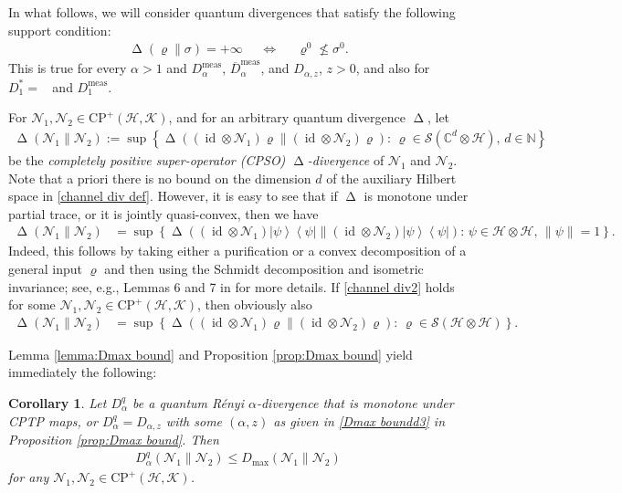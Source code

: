 \documentclass[unsortedaddress,superscriptaddress,pra,notitlepage]{revtex4}
\newtheorem{cor}[definition]{Corollary}
\def\N{\mathcal{N}}
\def\S{{\mathcal S}}
\def\bN{\mathbb{N}}
\def\bC{\mathbb{C}}
\def\rho{\varrho}
\def\hil{{\mathcal H}}
\def\kil{{\mathcal K}}
\def\iff{\Longleftrightarrow}
\def\bz{\left(}
\def\jz{\right)}
\def\oll{\overline}
\def\CP{\mathrm{CP}}
\def\nw{^{*}}
\def\meas{\mathrm{meas}}
\newcommand{\ki}[1]{\textit{\textit{#1}}}
\newcommand{\ds}{\mbox{ }\mbox{ }}
\newcommand{\norm}[1]{\left\| #1\right\|}
\newcommand{\diad}[2]{\left|#1\right\rangle\!\left\langle #2\right|}
\newcommand{\pr}[1]{\diad{#1}{#1}}
\DeclareMathOperator{\id}{id}
\DeclareMathOperator{\divv}{\Delta}
\DeclareMathOperator{\DU}{\mathit{D}^{Um}}
\begin{document}
In what follows, we will consider quantum divergences that satisfy the following support condition:
\begin{align}\label{support condition}
\divv(\rho\|\sigma)=+\infty\ds\iff\ds\rho^0\nleq\sigma^0.
\end{align}
This is true for every $\alpha>1$ and $D_{\alpha}^{\meas}$, $\oll{D}_{\alpha}^{\meas}$, and $D_{\alpha,z}$, $z>0$, and also for $D_1\nw=\DU$ and $D_1^{\meas}$.

For $\N_1,\N_2\in \CP^+(\hil,\kil)$, and for an arbitrary 
quantum divergence $\divv$, let 
\begin{align}\label{channel div def}
\divv(\N_1\|\N_2):=\sup\left\{\divv\bz(\id\otimes\N_1)\rho\|(\id\otimes\N_2)\rho\jz:\,
\rho\in\S(\bC^d\otimes\hil),\,d\in\bN\right\}
\end{align}
be the \ki{completely positive super-operator (CPSO) $\divv$-divergence} of $\N_1$ and $\N_2$.
Note that a priori there is no bound on the dimension $d$ of the auxiliary Hilbert space 
in \eqref{channel div def}. However, 
it is easy to see that if $\divv$ is monotone under partial trace, or it is jointly quasi-convex, then we have 
\begin{align}\label{channel div2}
\divv(\N_1\|\N_2)
&=
\sup\left\{\divv\bz(\id\otimes\N_1)\pr{\psi}\|(\id\otimes\N_2)\pr{\psi}\jz:\,
\psi\in\hil\otimes\hil,\,\norm{\psi}=1\right\}.
\end{align}
Indeed, this follows by taking either a purification or a convex decomposition of a general input $\rho$ and then using the Schmidt decomposition and isometric invariance;
see, e.g., Lemmas 6 and 7 in \cite{CMW} for more details.
If \eqref{channel div2} holds for some 
$\N_1,\N_2\in\CP^+(\hil,\kil)$, then obviously also
\begin{align}\label{channel div3}
\divv(\N_1\|\N_2)
&=
\sup\left\{\divv\bz(\id\otimes\N_1)\rho\|(\id\otimes\N_2)\rho\jz:\,
\rho\in\S(\hil\otimes\hil)\right\}.
\end{align}

Lemma \ref{lemma:Dmax bound} and Proposition \ref{prop:Dmax bound} yield immediately the following:
\begin{cor}
Let $D_{\alpha}^q$ be a quantum R\'enyi $\alpha$-divergence that is monotone under CPTP maps, 
or $D_{\alpha}^q=D_{\alpha,z}$ with 
some $(\alpha,z)$ as given in \ref{Dmax boundd3} in Proposition \ref{prop:Dmax bound}.
Then 
\begin{align}\label{ch maxrelentr bound}
D_{\alpha}^q(\N_1\|\N_2)\le D_{\max}(\N_1\|\N_2)
\end{align}
for any $\N_1,\N_2\in\CP^+(\hil,\kil)$. 
\end{cor}
\end{document}

